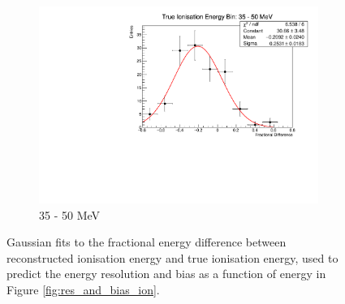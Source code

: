 \begin{figure}
\begin{subfigure}[b]{0.49\textwidth}
		\includegraphics[width=\textwidth]{figures/ion_res_35.pdf}
		\caption {35 - 50 MeV}
	\end{subfigure}

	\caption{Gaussian fits to the fractional energy difference between 
		reconstructed ionisation energy and true ionisation energy, used to predict 
		the energy resolution and bias as a function of energy in Figure 
		\ref{fig:res_and_bias_ion}.}
	\label{fig:ionisation_fits}

\end{figure}

\newpage
